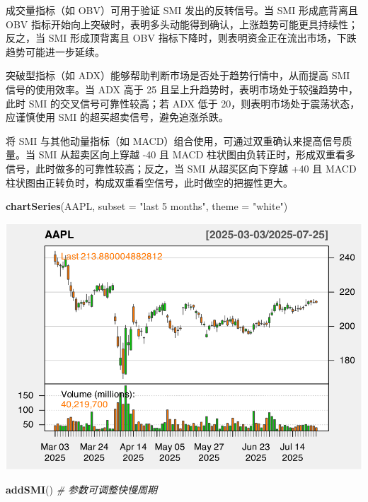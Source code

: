 \documentclass[]{ctexbook}
\newenvironment{Shaded}{\begin{snugshade}}{\end{snugshade}}
\newcommand{\AttributeTok}[1]{\textcolor[rgb]{0.13,0.29,0.53}{#1}}
\newcommand{\CommentTok}[1]{\textcolor[rgb]{0.56,0.35,0.01}{\textit{#1}}}
\newcommand{\FunctionTok}[1]{\textcolor[rgb]{0.13,0.29,0.53}{\textbf{#1}}}
\newcommand{\NormalTok}[1]{#1}
\newcommand{\StringTok}[1]{\textcolor[rgb]{0.31,0.60,0.02}{#1}}
\begin{document}
成交量指标（如 OBV）可用于验证 SMI 发出的反转信号。当 SMI 形成底背离且 OBV 指标开始向上突破时，表明多头动能得到确认，上涨趋势可能更具持续性；反之，当 SMI 形成顶背离且 OBV 指标下降时，则表明资金正在流出市场，下跌趋势可能进一步延续。

突破型指标（如 ADX）能够帮助判断市场是否处于趋势行情中，从而提高 SMI 信号的使用效率。当 ADX 高于 25 且呈上升趋势时，表明市场处于较强趋势中，此时 SMI 的交叉信号可靠性较高；若 ADX 低于 20，则表明市场处于震荡状态，应谨慎使用 SMI 的超买超卖信号，避免追涨杀跌。

将 SMI 与其他动量指标（如 MACD）组合使用，可通过双重确认来提高信号质量。当 SMI 从超卖区向上穿越 -40 且 MACD 柱状图由负转正时，形成双重看多信号，此时做多的可靠性较高；反之，当 SMI 从超买区向下穿越 +40 且 MACD 柱状图由正转负时，构成双重看空信号，此时做空的把握性更大。

\begin{Shaded}
\begin{Highlighting}[]
\FunctionTok{chartSeries}\NormalTok{(AAPL, }\AttributeTok{subset =} \StringTok{"last 5 months"}\NormalTok{, }\AttributeTok{theme =} \StringTok{"white"}\NormalTok{)}
\end{Highlighting}
\end{Shaded}

\includegraphics[width=0.9\linewidth]{QuantmodHandbook_files/figure-latex/smi_2-1}

\begin{Shaded}
\begin{Highlighting}[]
\FunctionTok{addSMI}\NormalTok{()  }\CommentTok{\# 参数可调整快慢周期}
\end{Highlighting}
\end{Shaded}
\end{document}
